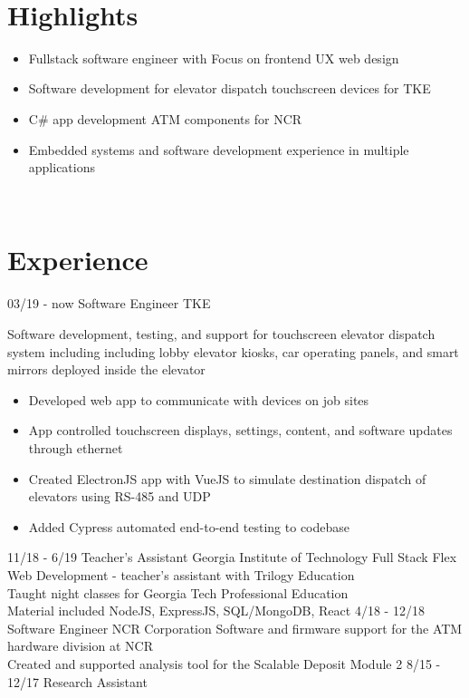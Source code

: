 \documentclass[]{cv}
\begin{document}
\begin{body}
	~
	\section{Highlights}
	\begin{itemize}
		\item {Fullstack software engineer with Focus on frontend UX web design}
		\item {Software development for elevator dispatch touchscreen devices for TKE}
		\item {C\# app development ATM components for NCR}
		\item {Embedded systems and software development experience in multiple applications}
	\end{itemize}
	~
	\section{Experience}
	\begin{entrylist}
		\entry
		{03/19 - now}
		{Software Engineer}
		{TKE}
		{Software development, testing, and support for touchscreen elevator dispatch system including including lobby elevator kiosks, car operating panels, and smart mirrors deployed inside the elevator
			\begin{itemize}
				\item {Developed web app to communicate with devices on job sites}
				\item {App controlled touchscreen displays, settings, content, and software updates through ethernet}
				\item {Created ElectronJS app with VueJS to simulate destination dispatch of elevators using RS-485 and UDP}
				\item {Added Cypress automated end-to-end testing to codebase}
			\end{itemize}
		}
		\entry
		{11/18 - 6/19}
		{Teacher's Assistant}
		{Georgia Institute of Technology}
		{Full Stack Flex Web Development - teacher's assistant with Trilogy Education\\
			Taught night classes for Georgia Tech Professional Education\\
			Material included NodeJS, ExpressJS, SQL/MongoDB, React}
		\entry
		{4/18 - 12/18}
		{Software Engineer}
		{NCR Corporation}
		{Software and firmware support for the ATM hardware division at NCR \\
			Created and supported analysis tool for the Scalable Deposit Module 2}
		\entry
		{8/15 - 12/17}
		{Research Assistant}

\end{entrylist}
\end{body}
\end{document}
